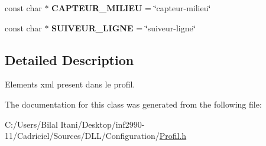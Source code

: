 \begin{DoxyCompactItemize}
\item 
const char $\ast$ {\bfseries C\+A\+P\+T\+E\+U\+R\+\_\+\+M\+I\+L\+I\+EU} = \char`\"{}capteur-\/milieu\char`\"{}\hypertarget{class_element_x_m_l_afabee63df68fdc76659daf355836ba59}{}\label{class_element_x_m_l_afabee63df68fdc76659daf355836ba59}

\item 
const char $\ast$ {\bfseries S\+U\+I\+V\+E\+U\+R\+\_\+\+L\+I\+G\+NE} = \char`\"{}suiveur-\/ligne\char`\"{}\hypertarget{class_element_x_m_l_ab643094b200c13137c2c791c92e36ff6}{}\label{class_element_x_m_l_ab643094b200c13137c2c791c92e36ff6}

\end{DoxyCompactItemize}


\subsection{Detailed Description}
Elements xml present dans le profil. 

The documentation for this class was generated from the following file\+:\begin{DoxyCompactItemize}
\item 
C\+:/\+Users/\+Bilal Itani/\+Desktop/inf2990-\/11/\+Cadriciel/\+Sources/\+D\+L\+L/\+Configuration/\hyperlink{_profil_8h}{Profil.\+h}\end{DoxyCompactItemize}
